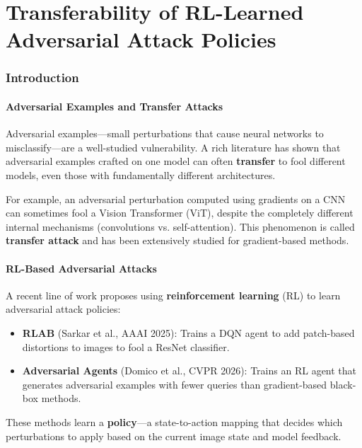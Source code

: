 \documentclass[11pt,a4paper]{article}
\begin{document}
\part{Transferability of RL-Learned Adversarial Attack Policies}

\section{Introduction}

\subsection{Adversarial Examples and Transfer Attacks}

Adversarial examples---small perturbations that cause neural networks to misclassify---are a well-studied vulnerability. A rich literature has shown that adversarial examples crafted on one model can often \textbf{transfer} to fool different models, even those with fundamentally different architectures.

For example, an adversarial perturbation computed using gradients on a CNN can sometimes fool a Vision Transformer (ViT), despite the completely different internal mechanisms (convolutions vs. self-attention). This phenomenon is called \textbf{transfer attack} and has been extensively studied for gradient-based methods.

\subsection{RL-Based Adversarial Attacks}

A recent line of work proposes using \textbf{reinforcement learning} (RL) to learn adversarial attack policies:

\begin{itemize}
    \item \textbf{RLAB} (Sarkar et al., AAAI 2025): Trains a DQN agent to add patch-based distortions to images to fool a ResNet classifier.

    \item \textbf{Adversarial Agents} (Domico et al., CVPR 2026): Trains an RL agent that generates adversarial examples with fewer queries than gradient-based black-box methods.
\end{itemize}

These methods learn a \textbf{policy}---a state-to-action mapping that decides which perturbations to apply based on the current image state and model feedback.
\end{document}
